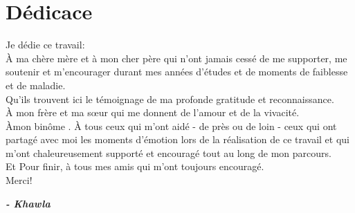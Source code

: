\chapter*{Dédicace}

\begin{fquote}
\begin{center}
\large{
Je dédie ce travail:\\[12pt]
\uppercase{à} ma chère mère et à mon cher père qui n'ont jamais cessé de me supporter, me soutenir et m'encourager durant mes années d'études et de moments de faiblesse et de maladie.\\[12pt]
Qu'ils trouvent ici le témoignage de ma profonde gratitude et reconnaissance.
\\[12pt]
\uppercase{à} mon frère et ma sœur qui me donnent de l'amour et de la vivacité.
\\[12pt]
\uppercase{à}mon binôme .
\uppercase{à} tous ceux qui m'ont aidé - de près ou de loin - ceux qui ont partagé avec moi les moments d'émotion lors de la réalisation de ce travail et qui m'ont chaleureusement supporté et encouragé tout au long de mon parcours.\\[12pt]
\uppercase{E}t Pour finir, à tous mes amis qui m'ont toujours encouragé.\\[12pt]
Merci!
}
\end{center}
\bigskip
\medskip
\end{fquote}

\begin{adjustwidth}{2cm}{1cm}
\hspace*{\fill} \textbf{\textit{\large{- Khawla}}}
\end{adjustwidth}

\clearpage